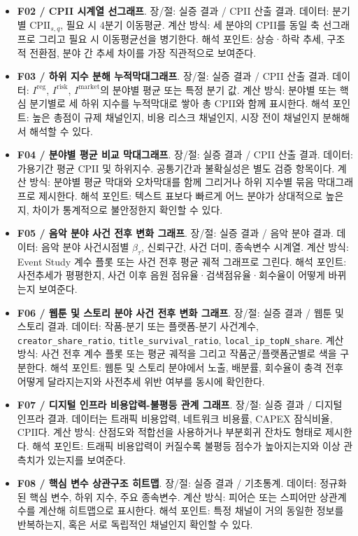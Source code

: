 \documentclass[11pt,a4paper]{report}
\newenvironment{summarylist}{\begin{itemize}[leftmargin=1.8em,itemsep=0.35em,topsep=0.35em]\RaggedRight}{\end{itemize}}
\begin{document}
\begin{summarylist}
  \item \textbf{F02 / CPII 시계열 선그래프}. 장/절: 실증 결과 / CPII 산출 결과. 데이터: 분기별 $\mathrm{CPII}_{s,q}$, 필요 시 4분기 이동평균. 계산 방식: 세 분야의 CPII를 동일 축 선그래프로 그리고 필요 시 이동평균선을 병기한다. 해석 포인트: 상승·하락 추세, 구조적 전환점, 분야 간 추세 차이를 가장 직관적으로 보여준다.
  \item \textbf{F03 / 하위 지수 분해 누적막대그래프}. 장/절: 실증 결과 / CPII 산출 결과. 데이터: $I^{\mathrm{reg}}$, $I^{\mathrm{risk}}$, $I^{\mathrm{market}}$의 분야별 평균 또는 특정 분기 값. 계산 방식: 분야별 또는 핵심 분기별로 세 하위 지수를 누적막대로 쌓아 총 CPII와 함께 표시한다. 해석 포인트: 높은 총점이 규제 채널인지, 비용 리스크 채널인지, 시장 전이 채널인지 분해해서 해석할 수 있다.
  \item \textbf{F04 / 분야별 평균 비교 막대그래프}. 장/절: 실증 결과 / CPII 산출 결과. 데이터: 가용기간 평균 CPII 및 하위지수. 공통기간과 불확실성은 별도 검증 항목이다. 계산 방식: 분야별 평균 막대와 오차막대를 함께 그리거나 하위 지수별 묶음 막대그래프로 제시한다. 해석 포인트: 텍스트 표보다 빠르게 어느 분야가 상대적으로 높은지, 차이가 통계적으로 불안정한지 확인할 수 있다.
  \item \textbf{F05 / 음악 분야 사건 전후 변화 그래프}. 장/절: 실증 결과 / 음악 분야 결과. 데이터: 음악 분야 사건시점별 $\hat{\beta}_{\tau}$, 신뢰구간, 사건 더미, 종속변수 시계열. 계산 방식: Event Study 계수 플롯 또는 사건 전후 평균 궤적 그래프로 그린다. 해석 포인트: 사전추세가 평평한지, 사건 이후 음원 점유율·검색점유율·회수율이 어떻게 바뀌는지 보여준다.
  \item \textbf{F06 / 웹툰 및 스토리 분야 사건 전후 변화 그래프}. 장/절: 실증 결과 / 웹툰 및 스토리 결과. 데이터: 작품-분기 또는 플랫폼-분기 사건계수, \texttt{creator\_share\_ratio}, \texttt{title\_survival\_ratio}, \texttt{local\_ip\_topN\_share}. 계산 방식: 사건 전후 계수 플롯 또는 평균 궤적을 그리고 작품군/플랫폼군별로 색을 구분한다. 해석 포인트: 웹툰 및 스토리 분야에서 노출, 배분률, 회수율이 충격 전후 어떻게 달라지는지와 사전추세 위반 여부를 동시에 확인한다.
  \item \textbf{F07 / 디지털 인프라 비용압력-불평등 관계 그래프}. 장/절: 실증 결과 / 디지털 인프라 결과. 데이터는 트래픽 비용압력, 네트워크 비용률, CAPEX 잠식비율, $\mathrm{CPII}$다. 계산 방식: 산점도와 적합선을 사용하거나 부분회귀 잔차도 형태로 제시한다. 해석 포인트: 트래픽 비용압력이 커질수록 불평등 점수가 높아지는지와 이상 관측치가 있는지를 보여준다.
  \item \textbf{F08 / 핵심 변수 상관구조 히트맵}. 장/절: 실증 결과 / 기초통계. 데이터: 정규화된 핵심 변수, 하위 지수, 주요 종속변수. 계산 방식: 피어슨 또는 스피어만 상관계수를 계산해 히트맵으로 표시한다. 해석 포인트: 특정 채널이 거의 동일한 정보를 반복하는지, 혹은 서로 독립적인 채널인지 확인할 수 있다.

\end{summarylist}
\end{document}
